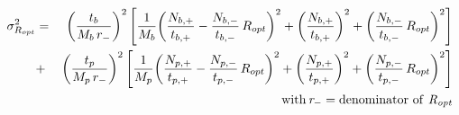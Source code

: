 


\begin{eqnarray*}
  \sigma_{R_{opt}}^2 & = & \,
         {\left( \frac{t_b} {M_b \, r_{-}} \right)}^2
         \left[ \frac{1}{M_b}
         { \left( \frac{N_{b,+}} {t_{b,+}} - \frac{N_{b,-}} {t_{b,-}}
         \, R_{opt} \right) }^2 +
         {\left( \frac{N_{b,+}} {t_{b,+}} \right)}^2 +
         {\left( \frac{N_{b,-}} {t_{b,-}}\,R_{opt} \right)}^2
         \right] \\
         & + & 
         {\left( \frac{t_p} {M_p \, r_{-}} \right)}^2
         \left[ \frac{1}{M_p}
         { \left( \frac{N_{p,+}} {t_{p,+}} - \frac{N_{p,-}} {t_{p,-}}
         \, R_{opt} \right) }^2
          + 
         {\left( \frac{N_{p,+}} {t_{p,+}} \right) }^2 +
         {\left( \frac{N_{p,-}} {t_{p,-}}\,R_{opt} \right)}^2
         \right] \\
         & \, & \mathrm{with \, {\it r_{-}} = 
            denominator \ of \ {\it R_{opt}}}
\end{eqnarray*}

